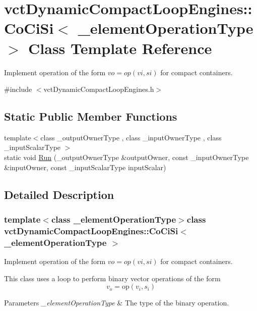 \hypertarget{classvct_dynamic_compact_loop_engines_1_1_co_ci_si}{}\section{vct\+Dynamic\+Compact\+Loop\+Engines\+:\+:Co\+Ci\+Si$<$ \+\_\+element\+Operation\+Type $>$ Class Template Reference}
\label{classvct_dynamic_compact_loop_engines_1_1_co_ci_si}


Implement operation of the form $vo = op(vi, si)$ for compact containers.  




{\ttfamily \#include $<$vct\+Dynamic\+Compact\+Loop\+Engines.\+h$>$}

\subsection*{Static Public Member Functions}
\begin{DoxyCompactItemize}
\item 
{\footnotesize template$<$class \+\_\+output\+Owner\+Type , class \+\_\+input\+Owner\+Type , class \+\_\+input\+Scalar\+Type $>$ }\\static void \hyperlink{classvct_dynamic_compact_loop_engines_1_1_co_ci_si_a41d4466ae16598c2e973382b2e2df69e}{Run} (\+\_\+output\+Owner\+Type \&output\+Owner, const \+\_\+input\+Owner\+Type \&input\+Owner, const \+\_\+input\+Scalar\+Type input\+Scalar)
\end{DoxyCompactItemize}


\subsection{Detailed Description}
\subsubsection*{template$<$class \+\_\+element\+Operation\+Type$>$class vct\+Dynamic\+Compact\+Loop\+Engines\+::\+Co\+Ci\+Si$<$ \+\_\+element\+Operation\+Type $>$}

Implement operation of the form $vo = op(vi, si)$ for compact containers. 

This class uses a loop to perform binary vector operations of the form \[ v_o = \mathrm{op}(v_i, s_i) \]


\begin{DoxyParams}{Parameters}
{\em \+\_\+element\+Operation\+Type} & The type of the binary operation. \\
\hline
\end{DoxyParams}


